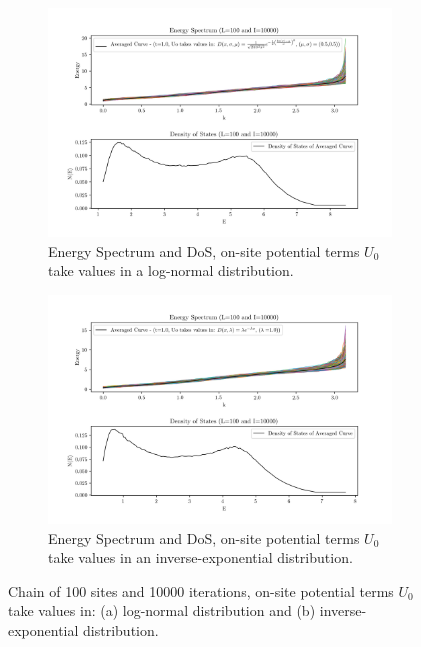 \documentclass[12pt]{article}
\begin{document}
\begin{figure}[ht]
		\centering
        \begin{subfigure}[a]{\textwidth}
        		\centering
                \includegraphics[scale=0.65]{EDOSCRL.png}
                \caption{Energy Spectrum and DoS, on-site potential terms $U_{0}$ take values in a log-normal distribution.}
                \label{f3a}
        \end{subfigure}
        \begin{subfigure}[b]{\textwidth}
        		\centering
                \includegraphics[scale=0.65]{EDOSCRE.png}
                \caption{ Energy Spectrum and DoS, on-site potential terms $U_{0}$ take values in an inverse-exponential distribution.}
                \label{f3b}
        \end{subfigure}
        \caption{Chain of 100 sites and 10000 iterations, on-site potential terms $U_{0}$ take values in: (a) log-normal distribution and (b)  inverse-exponential distribution.}
        \label{f3}
\end{figure}
\end{document}
